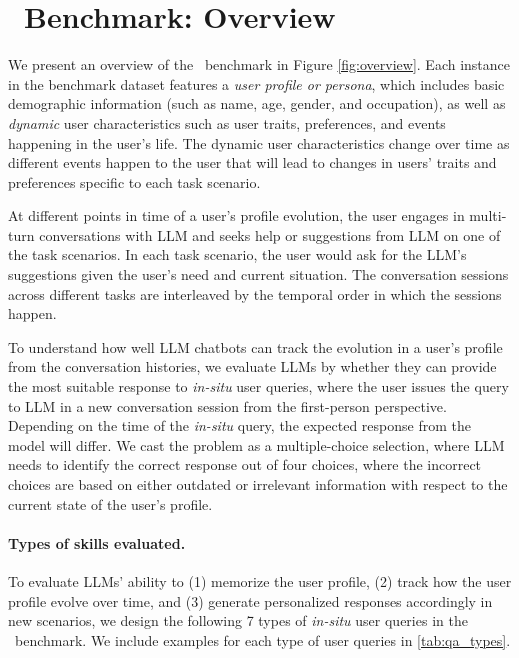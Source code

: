 \section{\datasetnameemoji~Benchmark: Overview}\label{sec:overview}
We present an overview of the \datasetname~benchmark in Figure \ref{fig:overview}. 
Each instance in the benchmark dataset features a \textit{user profile or persona}, which includes basic demographic information (such as name, age, gender, and occupation), as well as \textit{dynamic} user characteristics such as user traits, preferences, and events happening in the user's life.  The dynamic user characteristics change over time as different events happen to the user that will lead to changes in users' traits and preferences specific to each task scenario. 

At different points in time of a user's profile evolution, the user engages in multi-turn conversations with LLM and seeks help or suggestions from LLM on one of the task scenarios. In each task scenario, the user would ask for the LLM's suggestions given the user's need and current situation. The conversation sessions across different tasks are interleaved by the temporal order in which the sessions happen.

To understand how well LLM chatbots can track the evolution in a user's profile from the conversation histories, we evaluate LLMs by whether they can provide the most suitable response to \emph{in-situ} user queries, where the user issues the query to LLM in a new conversation session from the first-person perspective. Depending on the time of the \emph{in-situ} query, the expected response from the model will differ. We cast the problem as a multiple-choice selection, where LLM needs to identify the correct response out of four choices, where the incorrect choices are based on either outdated or irrelevant information with respect to the current state of the user's profile. 

\paragraph{Types of skills evaluated.}
To evaluate LLMs' ability to (1) memorize the user profile, (2) track how the user profile evolve over time, and (3) generate personalized responses accordingly in new scenarios, we design the following 7 types of \emph{in-situ} user queries in the \datasetname~benchmark. We include examples for each type of user queries in \autoref{tab:qa_types}. 

